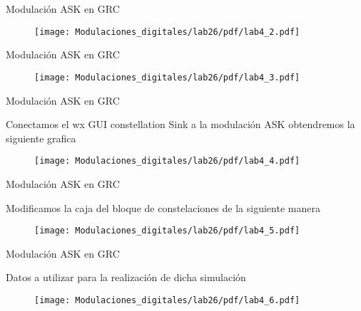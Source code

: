 \begin{frame}{Modulación ASK en GRC}
\begin{figure}[H]
\vspace{-1cm}
\centering
\texttt{[image: Modulaciones\_digitales/lab26/pdf/lab4\_2.pdf]}
\end{figure}
\end{frame}

\begin{frame}{Modulación ASK en GRC}
\vspace{-1.5cm}
\begin{figure}[H]
\centering
\texttt{[image: Modulaciones\_digitales/lab26/pdf/lab4\_3.pdf]}
\end{figure}
\end{frame}
\begin{frame}{Modulación ASK en GRC}
\begin{flushleft}
Conectamos el wx GUI constellation Sink a la modulación ASK  obtendremos la siguiente grafica
\end{flushleft}
\vspace{-0.5cm}
\begin{figure}[H]
\centering
\texttt{[image: Modulaciones\_digitales/lab26/pdf/lab4\_4.pdf]}
\end{figure}
\end{frame}
\begin{frame}{Modulación ASK en GRC}
\begin{flushleft}
Modificamos la caja del bloque de constelaciones de la siguiente manera
\end{flushleft}
\vspace{-0.3cm}
\begin{figure}[H]
\centering
\texttt{[image: Modulaciones\_digitales/lab26/pdf/lab4\_5.pdf]}
\end{figure}
\end{frame}
\begin{frame}{Modulación ASK en GRC}
\begin{flushleft}
Datos a utilizar para la realización de dicha simulación
\end{flushleft}
\vspace{-0.5cm}
\begin{figure}[H]
\centering
\texttt{[image: Modulaciones\_digitales/lab26/pdf/lab4\_6.pdf]}
\end{figure}
\end{frame}

